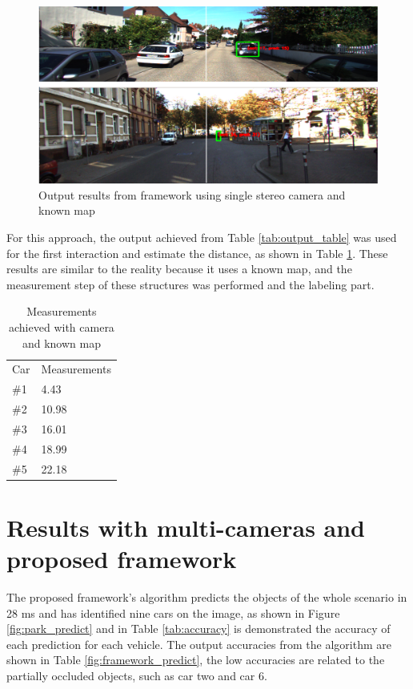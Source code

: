 \begin{figure}[H]
\centering
\includegraphics[width=\textwidth]{imagens/ouput.png}
\caption{Output results from framework using single stereo camera and known map}
\label{fig:output}
\end{figure}

For this approach, the output achieved from Table \ref{tab:output_table} was used for the first interaction and estimate the distance, as shown in Table \ref{tab:output_2}. These results are similar to the reality because it uses a known map, and the measurement step of these structures was performed and the labeling part.

\begin{table}[H]
\centering
\caption{Measurements achieved with camera and known map}
\begin{tabular}{l|l} 
\toprule
Car &  Measurements      \\
\#1   & 4.43        \\
\#2   & 10.98       \\
\#3   & 16.01       \\
\#4   & 18.99       \\
\#5   & 22.18       \\
\bottomrule
\end{tabular}
\label{tab:output_2}
\end{table} 


\section{Results with multi-cameras and proposed framework}


The proposed framework's algorithm predicts the objects of the whole scenario in 28 ms and has identified nine cars on the image, as shown in Figure \ref{fig:park_predict} and in Table \ref{tab:accuracy} is demonstrated the accuracy of each prediction for each vehicle. The output accuracies from the algorithm are shown in Table \ref{fig:framework_predict}, the low accuracies are related to the partially occluded objects, such as car two and car 6. 

